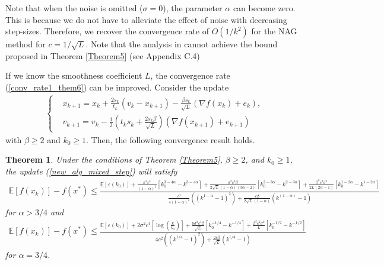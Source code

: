 \documentclass{article}
\theoremstyle{plain}
\newtheorem{thm}{\textbf{Theorem}}
\theoremstyle{definition}
\theoremstyle{remark}
\begin{document}
Note that when the noise is omitted ($\sigma=0$), the parameter $\alpha$ can become zero. This is because we do not have to alleviate the effect of noise with decreasing step-sizes. Therefore, we recover the convergence rate of $O(1/k^2)$ for the NAG method for $c=1/\sqrt{L}$.
Note that the analysis in \cite{pmlr-v108-laborde20a} cannot achieve the bound proposed in Theorem \ref{Theorem5} (see \cite{pmlr-v108-laborde20a} Appendix C.4)\par
If we know the smoothness coefficient $L$, the convergence rate (\ref{conv_rate1_them6}) can be improved. Consider the update
\begin{align}\label{new_alg_mixed_step}
    \left\{ \begin{array}{ll}
    &x_{k+1}   =    x_{k} + \frac{2s_k}{t_k}(v_k-x_{k+1})-\frac{\beta s_k}{\sqrt{L}}(\nabla f(x_k)+e_k),\\
     &v_{k+1}    = v_k -\tfrac{1}{2}(t_ks_k+\tfrac{2s_k \beta}{\sqrt{L}})(\nabla f(x_{k+1})+e_{k+1})
    \end{array}\right.
\end{align}
with $\beta \geq 2$ and $k_0\geq 1$. Then, the following convergence result holds.
\begin{thm}\label{Theorem6}
    Under the conditions of Theorem \ref{Theorem5}, $\beta \geq 2$, and $k_0\geq 1$, the update (\ref{new_alg_mixed_step}) will satisfy 
    \begin{align}
        \mathbb E[f(x_k)]-f(x^*)\leq \tfrac{\mathbb E[\varepsilon(k_0)]+\frac{\sigma^2 c^4}{(1-\alpha)^2} \left[ k_0^{3-4\alpha}-k^{3-4\alpha} \right] + \frac{\sigma^2c^3\beta}{2\sqrt{L}(1-\alpha)(3\alpha -2)}\left[ k_0^{2-3\alpha}-k^{2-3\alpha} \right]+\frac{\beta^2c^2\sigma^2}{2L(2\alpha-1)}\left[ k_0^{1-2\alpha}-k^{1-2\alpha} \right]}{\frac{c^2}{4(1-\alpha)^2}\left((k^{1-\alpha}-1)^2\right)+\frac{c\beta}{2\sqrt{L}(1-\alpha)}\left(k^{(1-\alpha)}-1\right)}\nonumber
    \end{align}
    for $\alpha > 3/4$ and
    \begin{align}
        \mathbb E[f(x_k)]-f(x^*)\leq \tfrac{\mathbb E[\varepsilon(k_0)]+2\sigma^2 c^4 \left[ \log(\frac{k}{k_0}) \right] + \frac{8\sigma^2c^3\beta}{\sqrt{L}}\left[ k_0^{-1/4}-k^{-1/4} \right]
        +\frac{\beta^2c^2\sigma^2}{L}\left[ k_0^{-1/2}-k^{-1/2} \right]}{4c^2\left((k^{1/4}-1)^2\right)+\frac{2c\beta}{\sqrt{L}}\left(k^{1/4}-1\right)}\nonumber
    \end{align}
    for $\alpha=3/4$.
\end{thm}
\end{document}
